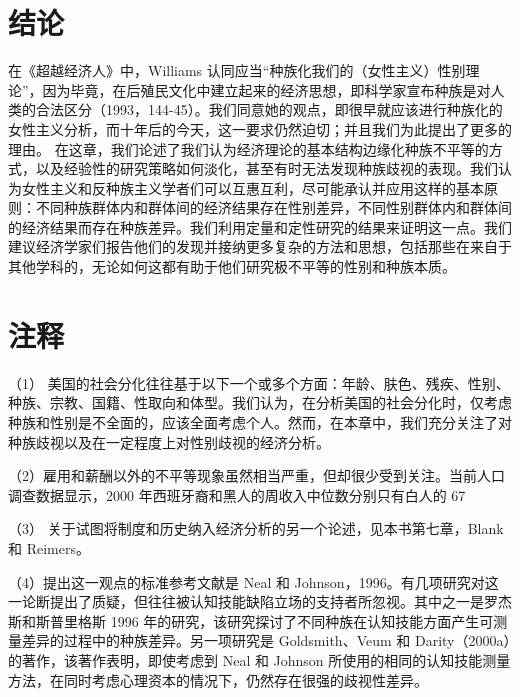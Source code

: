 \documentclass[UTF8]{ctexart}
\begin{document}
\section{结论}在《超越经济人》中，Williams 认同应当“种族化我们的（女性主义）性别理论”，因为毕竟，在后殖民文化中建立起来的经济思想，即科学家宣布种族是对人类的合法区分（1993，144-45）。我们同意她的观点，即很早就应该进行种族化的女性主义分析，而十年后的今天，这一要求仍然迫切；并且我们为此提出了更多的理由。
在这章，我们论述了我们认为经济理论的基本结构边缘化种族不平等的方式，以及经验性的研究策略如何淡化，甚至有时无法发现种族歧视的表现。我们认为女性主义和反种族主义学者们可以互惠互利，尽可能承认并应用这样的基本原则：不同种族群体内和群体间的经济结果存在性别差异，不同性别群体内和群体间的经济结果而存在种族差异。我们利用定量和定性研究的结果来证明这一点。我们建议经济学家们报告他们的发现并接纳更多复杂的方法和思想，包括那些在来自于其他学科的，无论如何这都有助于他们研究极不平等的性别和种族本质。

\section{注释}
（1）  美国的社会分化往往基于以下一个或多个方面：年龄、肤色、残疾、性别、种族、宗教、国籍、性取向和体型。我们认为，在分析美国的社会分化时，仅考虑种族和性别是不全面的，应该全面考虑个人。然而，在本章中，我们充分关注了对种族歧视以及在一定程度上对性别歧视的经济分析。


（2）雇用和薪酬以外的不平等现象虽然相当严重，但却很少受到关注。当前人口调查数据显示，2000 年西班牙裔和黑人的周收入中位数分别只有白人的 67%


（3）  关于试图将制度和历史纳入经济分析的另一个论述，见本书第七章，Blank 和 Reimers。


（4）提出这一观点的标准参考文献是 Neal 和 Johnson，1996。有几项研究对这一论断提出了质疑，但往往被认知技能缺陷立场的支持者所忽视。其中之一是罗杰斯和斯普里格斯 1996 年的研究，该研究探讨了不同种族在认知技能方面产生可测量差异的过程中的种族差异。另一项研究是 Goldsmith、Veum 和 Darity（2000a）的著作，该著作表明，即使考虑到 Neal 和 Johnson 所使用的相同的认知技能测量方法，在同时考虑心理资本的情况下，仍然存在很强的歧视性差异。
\end{document}
